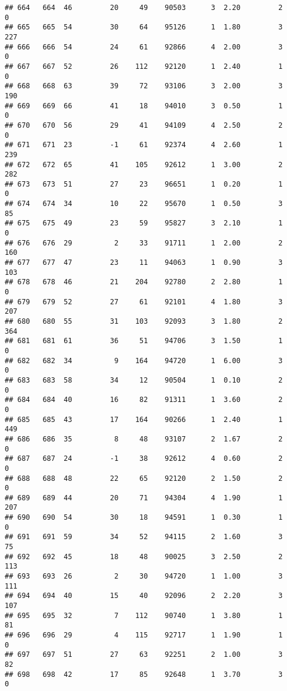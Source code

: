\documentclass[
]{article}
\begin{document}
\begin{verbatim}
## 664   664  46         20     49    90503      3  2.20         2        0
## 665   665  54         30     64    95126      1  1.80         3      227
## 666   666  54         24     61    92866      4  2.00         3        0
## 667   667  52         26    112    92120      1  2.40         1        0
## 668   668  63         39     72    93106      3  2.00         3      190
## 669   669  66         41     18    94010      3  0.50         1        0
## 670   670  56         29     41    94109      4  2.50         2        0
## 671   671  23         -1     61    92374      4  2.60         1      239
## 672   672  65         41    105    92612      1  3.00         2      282
## 673   673  51         27     23    96651      1  0.20         1        0
## 674   674  34         10     22    95670      1  0.50         3       85
## 675   675  49         23     59    95827      3  2.10         1        0
## 676   676  29          2     33    91711      1  2.00         2      160
## 677   677  47         23     11    94063      1  0.90         3      103
## 678   678  46         21    204    92780      2  2.80         1        0
## 679   679  52         27     61    92101      4  1.80         3      207
## 680   680  55         31    103    92093      3  1.80         2      364
## 681   681  61         36     51    94706      3  1.50         1        0
## 682   682  34          9    164    94720      1  6.00         3        0
## 683   683  58         34     12    90504      1  0.10         2        0
## 684   684  40         16     82    91311      1  3.60         2        0
## 685   685  43         17    164    90266      1  2.40         1      449
## 686   686  35          8     48    93107      2  1.67         2        0
## 687   687  24         -1     38    92612      4  0.60         2        0
## 688   688  48         22     65    92120      2  1.50         2        0
## 689   689  44         20     71    94304      4  1.90         1      207
## 690   690  54         30     18    94591      1  0.30         1        0
## 691   691  59         34     52    94115      2  1.60         3       75
## 692   692  45         18     48    90025      3  2.50         2      113
## 693   693  26          2     30    94720      1  1.00         3      111
## 694   694  40         15     40    92096      2  2.20         3      107
## 695   695  32          7    112    90740      1  3.80         1       81
## 696   696  29          4    115    92717      1  1.90         1        0
## 697   697  51         27     63    92251      2  1.00         3       82
## 698   698  42         17     85    92648      1  3.70         3        0

\end{verbatim}
\end{document}
